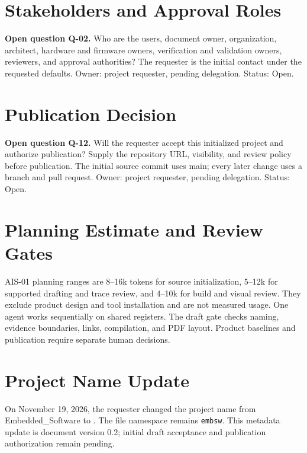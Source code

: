 \section{Stakeholders and Approval Roles}
\label{Question:Q-02}
\par\noindent\textbf{Open question Q-02.} Who are the users, document owner, organization, architect, hardware and firmware owners, verification and validation owners, reviewers, and approval authorities? The requester is the initial contact under the requested defaults. Owner: project requester, pending delegation. Status: Open.
\section{Publication Decision}
\label{Question:Q-12}
\par\noindent\textbf{Open question Q-12.} Will the requester accept this initialized project and authorize publication? Supply the repository URL, visibility, and review policy before publication. The initial source commit uses main; every later change uses a branch and pull request. Owner: project requester, pending delegation. Status: Open.
\section{Planning Estimate and Review Gates}
AIS-01 planning ranges are 8--16k tokens for source initialization, 5--12k for
supported drafting and trace review, and 4--10k for build and visual review.
They exclude product design and tool installation and are not measured usage.
One agent works sequentially on shared registers. The draft gate checks naming,
evidence boundaries, links, compilation, and PDF layout. Product baselines and
publication require separate human decisions.

\section{Project Name Update}
\label{Section:ProjectNameUpdate}
On November 19, 2026, the requester changed the project name from
Embedded\_Software to \ProjectName. The file namespace remains
\texttt{embsw}. This metadata update is document version 0.2; initial draft
acceptance and publication authorization remain pending.
